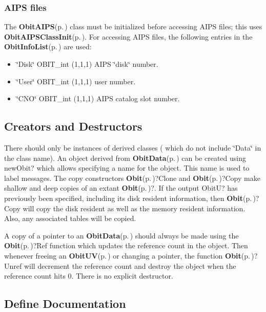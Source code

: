 \subsubsection{AIPS files}\label{ObitUV_8h_ObitUVAIPS}
The {\bf Obit\-AIPS}{\rm (p.\,\pageref{structObitAIPS})} class must be initialized before accessing AIPS files; this uses {\bf Obit\-AIPSClass\-Init}{\rm (p.\,\pageref{ObitAIPS_8c_a5})}. For accessing AIPS files, the following entries in the {\bf Obit\-Info\-List}{\rm (p.\,\pageref{structObitInfoList})} are used: \begin{itemize}
\item \char`\"{}Disk\char`\"{} OBIT\_\-int (1,1,1) AIPS \char`\"{}disk\char`\"{} number. \item \char`\"{}User\char`\"{} OBIT\_\-int (1,1,1) user number. \item \char`\"{}CNO\char`\"{} OBIT\_\-int (1,1,1) AIPS catalog slot number.\end{itemize}
\subsection{Creators and Destructors}\label{ObitData_8h_ObitDataaccess}
There should only be instances of derived classes ( which do not include \char`\"{}Data\char`\"{} in the class name). An object derived from {\bf Obit\-Data}{\rm (p.\,\pageref{structObitData})} can be created using new\-Obit? which allows specifying a name for the object. This name is used to label messages. The copy constructors {\bf Obit}{\rm (p.\,\pageref{structObit})}?Clone and {\bf Obit}{\rm (p.\,\pageref{structObit})}?Copy make shallow and deep copies of an extant {\bf Obit}{\rm (p.\,\pageref{structObit})}?. If the output Obit\-U? has previously been specified, including its disk resident information, then {\bf Obit}{\rm (p.\,\pageref{structObit})}?Copy will copy the disk resident as well as the memory resident information. Also, any associated tables will be copied.

A copy of a pointer to an {\bf Obit\-Data}{\rm (p.\,\pageref{structObitData})} should always be made using the {\bf Obit}{\rm (p.\,\pageref{structObit})}?Ref function which updates the reference count in the object. Then whenever freeing an {\bf Obit\-UV}{\rm (p.\,\pageref{structObitUV})} or changing a pointer, the function {\bf Obit}{\rm (p.\,\pageref{structObit})}?Unref will decrement the reference count and destroy the object when the reference count hits 0. There is no explicit destructor.

\subsection{Define Documentation}

